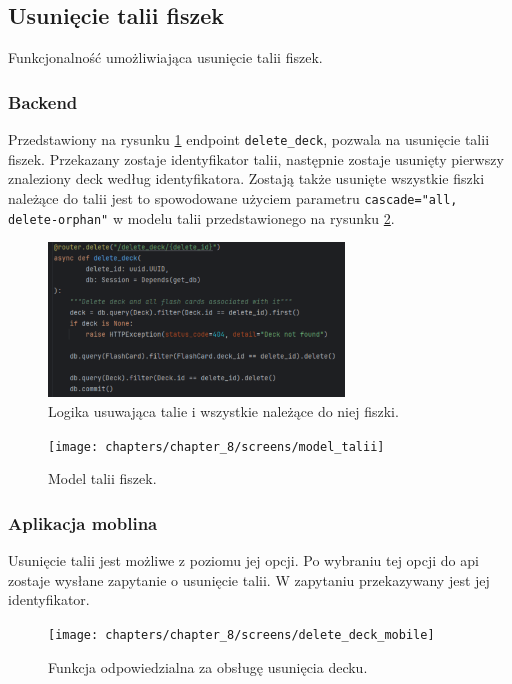 \subsection{Usunięcie talii fiszek}

Funkcjonalność umożliwiająca usunięcie talii fiszek.

\subsubsection{Backend}

Przedstawiony na rysunku \ref{img:delete_deck_backend} endpoint \texttt{delete\_deck}, pozwala na usunięcie talii fiszek. Przekazany zostaje identyfikator talii, następnie zostaje usunięty pierwszy znaleziony deck według identyfikatora. Zostają także usunięte wszystkie fiszki należące do talii jest to spowodowane użyciem parametru \texttt{cascade="all, delete-orphan"} w modelu talii przedstawionego na rysunku \ref{img:model_talii}.


\begin{figure}[H]
    \centering
    \includegraphics[width=0.7\textwidth]{chapters/chapter_8/screens/delete_deck_backend}
    \caption{Logika usuwająca talie i wszystkie należące do niej fiszki.}
    \label{img:delete_deck_backend}
\end{figure}

\begin{figure}[H]
    \centering
    \texttt{[image: chapters/chapter\_8/screens/model\_talii]}
    \caption{Model talii fiszek.}
    \label{img:model_talii}
\end{figure}


\subsubsection{Aplikacja moblina}
Usunięcie talii jest możliwe z poziomu jej opcji. Po wybraniu tej opcji do api zostaje wysłane zapytanie o usunięcie talii. W zapytaniu przekazywany jest jej identyfikator.

\begin{figure}[H]
    \centering
    \texttt{[image: chapters/chapter\_8/screens/delete\_deck\_mobile]}
    \caption{Funkcja odpowiedzialna za obsługę usunięcia decku.}
    \label{img:delete_deck_mobile}
\end{figure}

